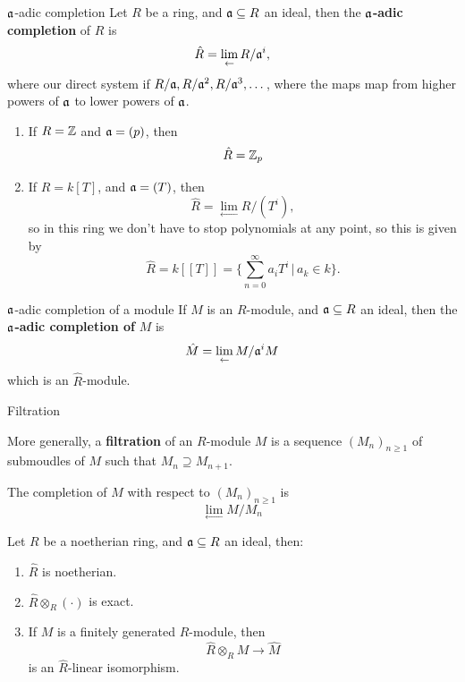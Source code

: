 \documentclass{article}
\begin{document}
\begin{fancydefine}{$\mathfrak{a}$-adic completion}
    Let $R$ be a ring, and $\mathfrak{a} \subseteq R$ an ideal, then the $\mathfrak{a}$\textbf{-adic completion} of $R$ is \[ \hat R = \lim_{\leftarrow} R/\mathfrak{a}^{i},\]
    where our direct system if $R/\mathfrak{a}, R/\mathfrak{a}^{2}, R/\mathfrak{a}^{3}, \dots$, where the maps map from higher powers of $\mathfrak{a}$ to lower powers of $\mathfrak{a}$.
\end{fancydefine}
\begin{exs*}
    \hspace{0.1cm}
    \begin{enumerate}
        \item If $R=\mathbb{Z}$ and $\mathfrak{a} = (p)$, then \[ \hat R = \mathbb{Z}_{p}\]
        \item If $R = k[T]$, and $\mathfrak{a} = (T)$, then \[ \hat R = \lim_{\leftarrow} R/(T^{i}),\] so in this ring we don't have to stop polynomials at any point, so this is given by \[\hat R = k[[T]] = \{ \sum_{n=0}^{\infty} a_{i}T^{i} \, | \, a_{k} \in k\}.\]
    \end{enumerate}
\end{exs*}
\begin{fancydefine}{$\mathfrak{a}$-adic completion of a module}
    If $M$ is an $R$-module, and $\mathfrak{a} \subseteq R$ an ideal, then the $\mathfrak{a}$\textbf{-adic completion of} $M$ is \[ \hat M = \lim_{\leftarrow} M/\mathfrak{a}^{i}M\] which is an $\hat R$-module.
\end{fancydefine}
\begin{fancydefine}{Filtration}
    \item More generally, a \textbf{filtration} of an $R$-module $M$ is a sequence $(M_{n})_{n \geq 1}$ of submoudles of $M$ such that $M_{n} \supseteq M_{n+1}$.
    \item The completion of $M$ with respect to $(M_{n})_{n \geq 1}$ is \[ \lim_{\leftarrow} M/M_{n}\]
\end{fancydefine}
\begin{fancythm}{}
    Let $R$ be a noetherian ring, and $\mathfrak{a} \subseteq R$ an ideal, then: \begin{enumerate}
        \item $\hat R$ is noetherian.
        \item $\hat R \otimes_{R} (\cdot)$ is exact.
        \item If $M$ is a finitely generated $R$-module, then \[ \hat R \otimes_{R} M \to \hat M\] is an $\hat R$-linear isomorphism. 
    \end{enumerate}
\end{fancythm}
\end{document}
